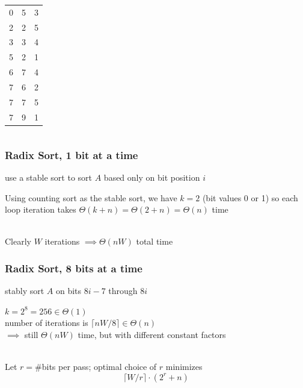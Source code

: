 \documentclass[10pt,aspectratio=169]{beamer}
\newcommand{\stanza}{ \\~\ }
\begin{document}
\begin{frame}
\begin{center}
\begin{columns}
\begin{column}{0.25\textwidth}
  \begin{center}
    \begin{tabular}{gcc}
      0&5&3 \\
      2&2&5 \\
      3&3&4 \\
      5&2&1 \\
      6&7&4 \\
      7&6&2 \\
      7&7&5 \\
      7&9&1 \\
    \end{tabular}
  \end{center}
\end{column}
\end{columns}
\end{center}
\end{frame}

\begin{frame} \frametitle{Radix Sort, 1 bit at a time}
  \begin{algorithmic}[1]
      \State use a stable sort to sort $A$ based only on
        bit position $i$
    \EndFor
    \EndFunction
  \end{algorithmic}
  \vspace{.5cm}

Using counting sort as the stable sort, we have $k=2$ (bit values 0 or 1) so each
loop iteration takes $\Theta(k+n)=\Theta(2+n)=\Theta(n)$ time \stanza

Clearly $W$ iterations $\implies \Theta(nW)$ total time
\end{frame}

\begin{frame} \frametitle{Radix Sort, 8 bits at a time}
  \begin{algorithmic}[1]
      \State stably sort $A$ on bits $8i-7$ through $8i$
    \EndFor
    \EndFunction
  \end{algorithmic}
  \vspace{.5cm}

$k=2^8=256 \in \Theta(1)$ \\
number of iterations is $\lceil nW/8 \rceil \in \Theta(n)$ \\
$\implies$ still $\Theta(nW)$ time, but with different constant factors \stanza

Let $r=$\#bits per pass; optimal choice of $r$ minimizes
\[ \lceil W/r \rceil \cdot (2^r + n) \]
\end{frame}
\end{document}
